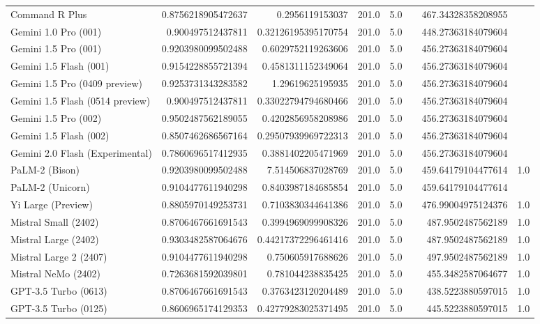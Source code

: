 \begin{table}[htp]
{\begin{tabular}{lrrrrrrr}
Command R Plus & 0.8756218905472637 & 0.2956119153037 & 201.0 & 5.0 &  & 467.34328358208955 &  \\
Gemini 1.0 Pro (001) & 0.900497512437811 & 0.32126195395170754 & 201.0 & 5.0 &  & 448.27363184079604 &  \\
Gemini 1.5 Pro (001) & 0.9203980099502488 & 0.6029752119263606 & 201.0 & 5.0 &  & 456.27363184079604 &  \\
Gemini 1.5 Flash (001) & 0.9154228855721394 & 0.4581311152349064 & 201.0 & 5.0 &  & 456.27363184079604 &  \\
Gemini 1.5 Pro (0409 preview) & 0.9253731343283582 & 1.29619625195935 & 201.0 & 5.0 &  & 456.27363184079604 &  \\
Gemini 1.5 Flash (0514 preview) & 0.900497512437811 & 0.33022794794680466 & 201.0 & 5.0 &  & 456.27363184079604 &  \\
Gemini 1.5 Pro (002) & 0.9502487562189055 & 0.4202856958208986 & 201.0 & 5.0 &  & 456.27363184079604 &  \\
Gemini 1.5 Flash (002) & 0.8507462686567164 & 0.29507939969722313 & 201.0 & 5.0 &  & 456.27363184079604 &  \\
Gemini 2.0 Flash (Experimental) & 0.7860696517412935 & 0.3881402205471969 & 201.0 & 5.0 &  & 456.27363184079604 &  \\
PaLM-2 (Bison) & 0.9203980099502488 & 7.514506837028769 & 201.0 & 5.0 &  & 459.64179104477614 & 1.0 \\
PaLM-2 (Unicorn) & 0.9104477611940298 & 0.8403987184685854 & 201.0 & 5.0 &  & 459.64179104477614 &  \\
Yi Large (Preview) & 0.8805970149253731 & 0.7103830344641386 & 201.0 & 5.0 &  & 476.99004975124376 & 1.0 \\
Mistral Small (2402) & 0.8706467661691543 & 0.3994969099908326 & 201.0 & 5.0 &  & 487.9502487562189 & 1.0 \\
Mistral Large (2402) & 0.9303482587064676 & 0.44217372296461416 & 201.0 & 5.0 &  & 487.9502487562189 & 1.0 \\
Mistral Large 2 (2407) & 0.9104477611940298 & 0.750605917688626 & 201.0 & 5.0 &  & 497.9502487562189 & 1.0 \\
Mistral NeMo (2402) & 0.7263681592039801 & 0.781044238835425 & 201.0 & 5.0 &  & 455.3482587064677 & 1.0 \\
GPT-3.5 Turbo (0613) & 0.8706467661691543 & 0.3763423120204489 & 201.0 & 5.0 &  & 438.5223880597015 & 1.0 \\
GPT-3.5 Turbo (0125) & 0.8606965174129353 & 0.42779283025371495 & 201.0 & 5.0 &  & 445.5223880597015 & 1.0 \\

\end{tabular}}
\end{table}
